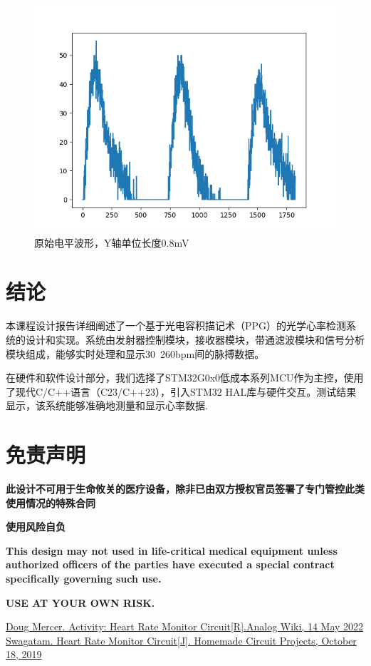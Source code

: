 \documentclass[a4paper]{ctexart}
\begin{document}
\begin{figure}[H]
	\centering
	\includegraphics[width=1.0\textwidth]{ppg.png}
	\caption{原始电平波形，Y轴单位长度0.8mV}
\end{figure}	


\newpage
\section{结论}
	
	本课程设计报告详细阐述了一个基于光电容积描记术（PPG）的光学心率检测系统的设计和实现。系统由发射器控制模块，接收器模块，带通滤波模块和信号分析模块组成，能够实时处理和显示30~260bpm间的脉搏数据。
	
	在硬件和软件设计部分，我们选择了STM32G0x0低成本系列MCU作为主控，使用了现代C/C++语言（C23/C++23），引入STM32 HAL库与硬件交互。测试结果显示，该系统能够准确地测量和显示心率数据.

\section{免责声明}
	\textbf{此设计不可用于生命攸关的医疗设备，除非已由双方授权官员签署了专门管控此类使用情况的特殊合同}
	
	\textbf{使用风险自负}
	
	\textbf{This design may not used in life-critical medical equipment unless authorized officers of the parties have executed a special contract specifically governing such use.}
	
	\textbf{USE AT YOUR OWN RISK.}

\newpage
\begin{thebibliography}{20}
	\href{https://wiki.analog.com/university/courses/alm1k/alm-lab-heart-rate-mon}{Doug Mercer. Activity: Heart Rate Monitor Circuit[R].Analog Wiki, 14 May 2022}
	\href{https://www.homemade-circuits.com/heart-rate-monitor-alarm-circuit/}{Swagatam. Heart Rate Monitor Circuit[J]. Homemade Circuit Projects, October 18, 2019}
\end{thebibliography}
\end{document}
